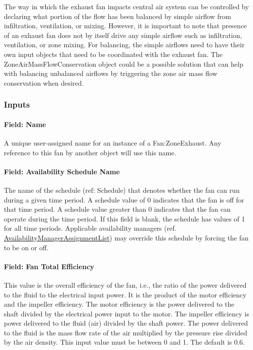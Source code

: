 The way in which the exhaust fan impacts central air system can be controlled by declaring what portion of the flow has been balanced by simple airflow from infiltration, ventilation, or mixing. However, it is important to note that presence of an exhaust fan does not by itself drive any simple airflow such as infiltration, ventilation, or zone mixing. For balancing, the simple airflows need to have their own input objects that need to be coordinated with the exhaust fan. The ZoneAirMassFlowConservation object could be a possible solution that can help with balancing unbalanced airflows by triggering the zone air mass flow conservation when desired.

\subsubsection{Inputs}\label{inputs-3-014}

\paragraph{Field: Name}\label{field-name-3-013}

A unique user-assigned name for an instance of a Fan:ZoneExhaust. Any reference to this fan by another object will use this name.

\paragraph{Field: Availability Schedule Name}\label{field-availability-schedule-name-3-002}

The name of the schedule (ref: Schedule) that denotes whether the fan can run during a given time period. A schedule value of 0 indicates that the fan is off for that time period. A schedule value greater than 0 indicates that the fan can operate during the time period. If this field is blank, the schedule has values of 1 for all time periods. Applicable availability managers (ref. \hyperref[availabilitymanagerassignmentlist]{AvailabilityManagerAssignmentList}) may override this schedule by forcing the fan to be on or off.

\paragraph{Field: Fan Total Efficiency}\label{field-fan-total-efficiency-3}

This value is the overall efficiency of the fan, i.e., the ratio of the power delivered to the fluid to the electrical input power. It is the product of the motor efficiency and the impeller efficiency. The motor efficiency is the power delivered to the shaft divided by the electrical power input to the motor. The impeller efficiency is power delivered to the fluid (air) divided by the shaft power. The power delivered to the fluid is the mass flow rate of the air multiplied by the pressure rise divided by the air density. This input value must be between 0 and 1. The default is 0.6.

